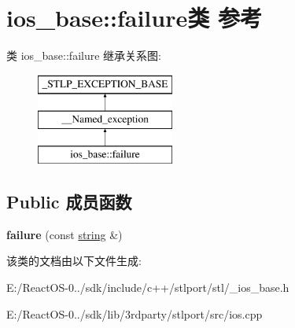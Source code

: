 \hypertarget{classios__base_1_1failure}{}\section{ios\+\_\+base\+:\+:failure类 参考}
\label{classios__base_1_1failure}
类 ios\+\_\+base\+:\+:failure 继承关系图\+:\begin{figure}[H]
\begin{center}
\leavevmode
\includegraphics[height=3.000000cm]{classios__base_1_1failure}
\end{center}
\end{figure}
\subsection*{Public 成员函数}
\begin{DoxyCompactItemize}
\item 
\mbox{\label{classios__base_1_1failure_a844d398e1d6dad4c87055d2d96f49157}} 
{\bfseries failure} (const \hyperlink{structstring}{string} \&)
\end{DoxyCompactItemize}


该类的文档由以下文件生成\+:\begin{DoxyCompactItemize}
\item 
E\+:/\+React\+O\+S-\/0../sdk/include/c++/stlport/stl/\+\_\+ios\+\_\+base.\+h\item 
E\+:/\+React\+O\+S-\/0../sdk/lib/3rdparty/stlport/src/ios.\+cpp\end{DoxyCompactItemize}
